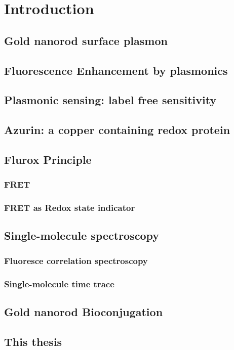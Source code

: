 \chapter{Introduction}
\section{Gold nanorod surface plasmon}
\section{Fluorescence Enhancement by plasmonics}
\section{Plasmonic sensing: label free sensitivity}
\section{Azurin: a copper containing redox protein}
\section{Flurox Principle}
\subsection{FRET}
\subsection{FRET as Redox state indicator}
\section{Single-molecule spectroscopy}
\subsection{Fluoresce correlation spectroscopy}
\subsection{Single-molecule time trace}
\section{Gold nanorod Bioconjugation}
\section{This thesis}